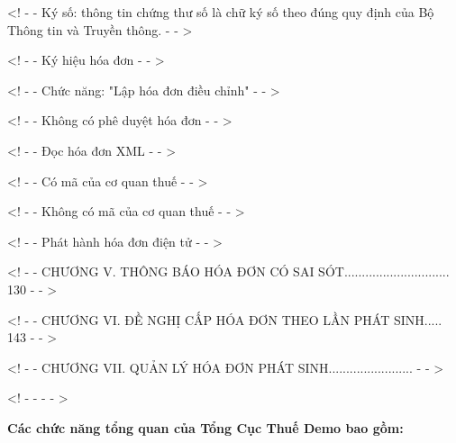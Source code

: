






<! - - Ký số: thông tin chứng thư số là chữ ký số theo đúng quy định của Bộ Thông tin và Truyền thông. - - >







<! - - Ký hiệu hóa đơn - - >







<! - - Chức năng: "Lập hóa đơn điều chỉnh" - - >







<! - - Không có phê duyệt hóa đơn - - >







<! - - Đọc hóa đơn XML - - >







<! - - Có mã của cơ quan thuế - - >



<! - - Không có mã của cơ quan thuế - - >







<! - - Phát hành hóa đơn điện tử - - >







<! - - CHƯƠNG V. THÔNG BÁO HÓA ĐƠN CÓ SAI SÓT.............................. 130 - - >



<! - - CHƯƠNG VI. ĐỀ NGHỊ CẤP HÓA ĐƠN THEO LẦN PHÁT SINH..... 143 - - >



<! - - CHƯƠNG VII. QUẢN LÝ HÓA ĐƠN PHÁT SINH........................ - - >



<! - - - - >







\textbf{Các chức năng tổng quan của Tổng Cục Thuế Demo bao gồm:}











